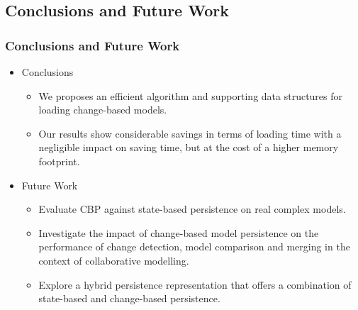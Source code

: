 \documentclass{beamer}
\begin{document}
\begin{frame}[fragile]
\section{Conclusions and Future Work}
\frametitle{Conclusions and Future Work}
\begin{itemize}
    \item Conclusions
    \begin{itemize}
        \item We proposes an efficient algorithm and supporting data structures for loading change-based models.
        \item Our results show considerable savings in terms of loading time with a negligible impact on saving time, but at the cost of a higher memory footprint.
    \end{itemize}
    \item Future Work
    \begin{itemize}
        \item Evaluate CBP against state-based persistence on real complex models.
        \item Investigate the impact of change-based model
        persistence on the performance of change detection, model comparison and merging in the context of collaborative modelling.
        \item Explore a hybrid persistence representation that offers a combination of state-based and change-based
        persistence.
    \end{itemize}   
\end{itemize}


\end{frame}

%
%
%
\end{document}
